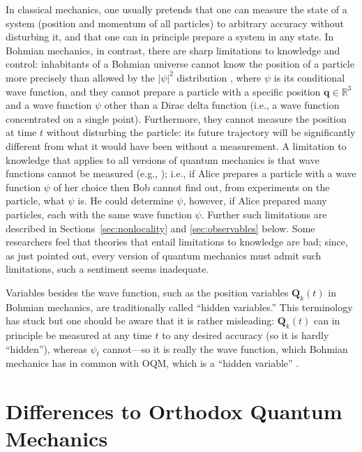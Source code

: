 \documentclass[12pt]{article}
\newcommand{\RRR}{\mathbb{R}}
\newcommand{\vQ}{\boldsymbol{Q}}
\newcommand{\vq}{\boldsymbol{q}}
\begin{document}
In classical mechanics, one usually pretends that one can measure the state of a system (position and momentum of all particles) to arbitrary accuracy without disturbing it, and that one can in principle prepare a system in any state. In Bohmian mechanics, in contrast, there are sharp limitations to knowledge and control: inhabitants of a Bohmian universe cannot know the position of a particle more precisely than allowed by the $|\psi|^2$ distribution \cite{DGZ92}, where $\psi$ is its conditional wave function, and they cannot prepare a particle with a specific position $\vq\in\RRR^3$ and a wave function $\psi$ other than a Dirac delta function (i.e., a wave function concentrated on a single point). Furthermore, they cannot measure the position at time $t$ without disturbing the particle: its future trajectory will be significantly different from what it would have been without a measurement. A limitation to knowledge that applies to all versions of quantum mechanics is that wave functions cannot be measured (e.g., \cite{CT16}); i.e., if Alice prepares a particle with a wave function $\psi$ of her choice then Bob cannot find out, from experiments on the particle, what $\psi$ is. He could determine $\psi$, however, if Alice prepared many particles, each with the same wave function $\psi$. Further such limitations are described in Sections~\ref{sec:nonlocality} and \ref{sec:observables} below. Some researchers feel that theories that entail limitations to knowledge are bad; since, as just pointed out, every version of quantum mechanics must admit such limitations, such a sentiment seems inadequate. 

Variables besides the wave function, such as the position variables $\vQ_k(t)$ in Bohmian mechanics, are traditionally called ``hidden variables.'' This terminology has stuck but one should be aware that it is rather misleading: $\vQ_k(t)$ can in principle be measured at any time $t$ to any desired accuracy (so it is hardly ``hidden''), whereas $\psi_t$ cannot---so it is really the wave function, which Bohmian mechanics has in common with OQM, which is a ``hidden variable'' \cite{Bell87}.



\section{Differences to Orthodox Quantum Mechanics}
\end{document}
